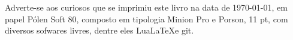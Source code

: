 \pagebreak
\blankpage

\ifodd\thepage\blankpage\fi

\parindent=0pt
\footnotesize\thispagestyle{empty}









\mbox{}\vfill
\begin{center}
		\begin{minipage}{.7\textwidth}\tiny\noindent{}
		\centering\tiny
		Adverte-se aos curiosos que se imprimiu este livro na data de \today, em papel 
		Pólen Soft 80, composto em tipologia Minion Pro e Porson, 11 pt, 
		com diversos sofwares livres,
		dentre eles Lua\LaTeX e git.\\ 
		\medskip\\\
		\end{minipage}
\end{center}